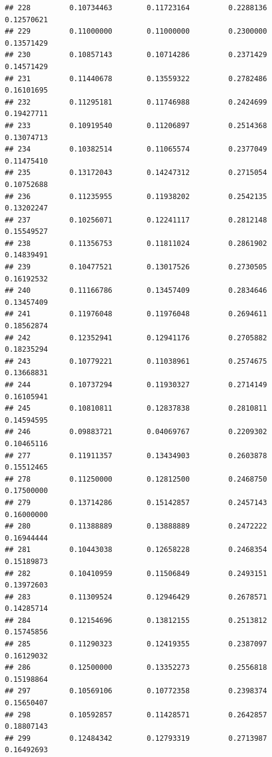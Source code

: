 \documentclass[]{article}
\begin{document}
\begin{verbatim}
## 228         0.10734463        0.11723164         0.2288136          0.12570621
## 229         0.11000000        0.11000000         0.2300000          0.13571429
## 230         0.10857143        0.10714286         0.2371429          0.14571429
## 231         0.11440678        0.13559322         0.2782486          0.16101695
## 232         0.11295181        0.11746988         0.2424699          0.19427711
## 233         0.10919540        0.11206897         0.2514368          0.13074713
## 234         0.10382514        0.11065574         0.2377049          0.11475410
## 235         0.13172043        0.14247312         0.2715054          0.10752688
## 236         0.11235955        0.11938202         0.2542135          0.13202247
## 237         0.10256071        0.12241117         0.2812148          0.15549527
## 238         0.11356753        0.11811024         0.2861902          0.14839491
## 239         0.10477521        0.13017526         0.2730505          0.16192532
## 240         0.11166786        0.13457409         0.2834646          0.13457409
## 241         0.11976048        0.11976048         0.2694611          0.18562874
## 242         0.12352941        0.12941176         0.2705882          0.18235294
## 243         0.10779221        0.11038961         0.2574675          0.13668831
## 244         0.10737294        0.11930327         0.2714149          0.16105941
## 245         0.10810811        0.12837838         0.2810811          0.14594595
## 246         0.09883721        0.04069767         0.2209302          0.10465116
## 277         0.11911357        0.13434903         0.2603878          0.15512465
## 278         0.11250000        0.12812500         0.2468750          0.17500000
## 279         0.13714286        0.15142857         0.2457143          0.16000000
## 280         0.11388889        0.13888889         0.2472222          0.16944444
## 281         0.10443038        0.12658228         0.2468354          0.15189873
## 282         0.10410959        0.11506849         0.2493151          0.13972603
## 283         0.11309524        0.12946429         0.2678571          0.14285714
## 284         0.12154696        0.13812155         0.2513812          0.15745856
## 285         0.11290323        0.12419355         0.2387097          0.16129032
## 286         0.12500000        0.13352273         0.2556818          0.15198864
## 297         0.10569106        0.10772358         0.2398374          0.15650407
## 298         0.10592857        0.11428571         0.2642857          0.18807143
## 299         0.12484342        0.12793319         0.2713987          0.16492693

\end{verbatim}
\end{document}

